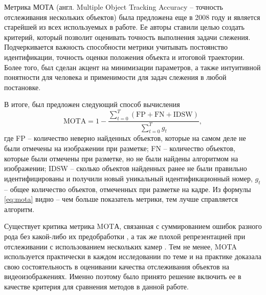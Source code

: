 Метрика МОТА\cite{bernardin2008evaluating} (англ. Multiple Object Tracking Accuracy -- точность отслеживания нескольких объектов) была предложена еще в 2008 году и является старейшей из всех используемых в работе. 
Ее авторы ставили целью создать критерий, который позволит оценивать точность выполнения задачи слежения. 
Подчеркивается важность способности метрики учитывать постоянство идентификации, точность оценки положения объекта и итоговой траектории.
Более того, был сделан акцент на минимизации параметров, а также интуитивной понятности для человека и применимости для задач слежения в любой постановке.

В итоге, был предложен следующий способ вычисления 
\begin{equation}
    \text{MOTA} = 1 - \frac{\sum_{t=0}^{T}(\text{FP} + \text{FN} + \text{IDSW})}{\sum_{t=0}^{T}g_t},
    \label{eq:mota}
\end{equation}
где FP -- количество неверно найденных объектов, которые на самом деле не были отмечены на изображении при разметке; FN -- количество объектов, которые были отмечены при разметке, но не были найдены алгоритмом на изображении; IDSW -- сколько объектов найденных ранее не были правильно идентифицированы и получили новый уникальный идентификационный номер, \(g_t\) -- общее количество объектов, отмеченных при разметке на кадре.
Из формулы \ref{eq:mota} видно -- чем больше показатель метрики, тем лучше справляется алгоритм.

Существует критика метрика MOTА, связанная с суммированием ошибок разного рода без какой-либо их предобработки \cite{dendorfer2021motchallenge}, а так же плохой репрезентацией при отслеживании с использованием нескольких камер \cite{ristani2016performance}. Тем не менее, MOTA используется практически в каждом исследовании по теме и на практике доказала свою состоятельность в оценивании качества отслеживания объектов на видеоизображениях. Именно поэтому было принято решение включить ее в качестве критерия для сравнения методов в данной работе.